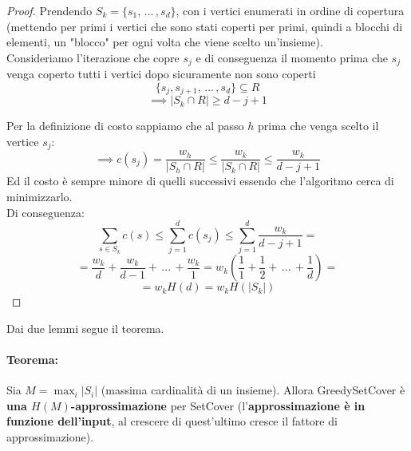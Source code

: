 \documentclass[11pt]{article}
\begin{document}
	\begin{proof}
		Prendendo $S_k=\{s_1, \, ... \, , s_d\}$, con i vertici enumerati in ordine di copertura (mettendo per primi i vertici che sono stati coperti per primi, quindi a blocchi di elementi, un "blocco" per ogni volta che viene scelto un'insieme).\\
		
		Consideriamo l'iterazione che copre $s_j$ e di conseguenza il momento prima che $s_j$ venga coperto tutti i vertici dopo sicuramente non sono coperti
		$$ \{s_j , s_{j+1}, \, ... \, , s_d\} \subseteq R $$
		$$ \implies |S_k \cap R| \geq d - j + 1 $$
		
		\newpage
		
		Per la definizione di costo sappiamo che al passo $h$ prima che venga scelto il vertice $s_j$:
		$$ \implies c(s_j)  =\frac{w_h}{|S_h \cap R|} \leq \frac{w_k}{|S_k \cap R|} \leq \frac{w_k}{d-j+1}$$
		Ed il costo è sempre minore di quelli successivi essendo che l'algoritmo cerca di minimizzarlo.\\
		
		Di conseguenza:
		$$ \sum_{s \in S_k} c(s) \leq \sum_{j=1}^d c(s_j)  \leq \sum_{j=1}^d \frac{w_k}{d-j+1} =$$
		$$ = \frac{w_k}{d} + \frac{w_k}{d-1} + \, ... \, + \frac{w_k}{1} = w_k \left(\frac{1}{1} + \frac{1}{2} + \, ... \, + \frac{1}{d} \right) = $$
		$$ = w_k H(d) = w_k H(|S_k|) $$ 
	\end{proof}

	
	\newpage
	
	Dai due lemmi segue il teorema.
	
	\paragraph{Teorema:} Sia $M = \max_i |S_i|$ (massima cardinalità di un insieme). Allora GreedySetCover è \textbf{una $H(M)$-approssimazione} per SetCover (l'\textbf{approssimazione è in funzione dell'input}, al crescere di quest'ultimo cresce il fattore di approssimazione). \\
	
\end{document}
